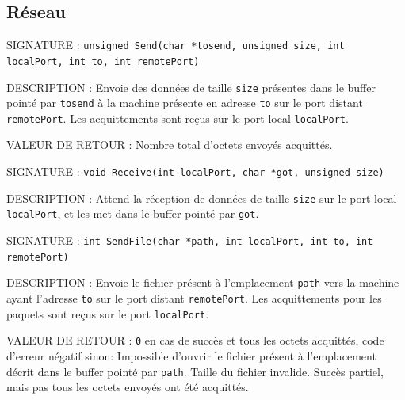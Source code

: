 \documentclass{article}
\begin{document}
	\subsection{Réseau}
		\begin{description}
			\item{SIGNATURE : } \texttt{unsigned Send(char *tosend, unsigned size, int localPort, int to, int remotePort)}
			\item{DESCRIPTION : Envoie des données de taille \texttt{size} présentes dans le buffer pointé par \texttt{tosend} à la machine présente en adresse \texttt{to} sur le port distant \texttt{remotePort}. Les acquittements sont reçus sur le port local \texttt{localPort}.} 
			\item{VALEUR DE RETOUR : Nombre total d'octets envoyés acquittés.} 
		\end{description}
		\vspace{2.5mm}
		\begin{description}
			\item{SIGNATURE : } \texttt{void Receive(int localPort, char *got, unsigned size)}
			\item{DESCRIPTION : Attend la réception de données de taille \texttt{size} sur le port local \texttt{localPort}, et les met dans le buffer pointé par \texttt{got}.} 
		\end{description}
		\vspace{2.5mm}
		\begin{description}
			\item{SIGNATURE : } \texttt{int SendFile(char *path, int localPort, int to, int remotePort)}
			\item{DESCRIPTION : Envoie le fichier présent à l'emplacement \texttt{path} vers la machine ayant l'adresse \texttt{to} sur le port distant \texttt{remotePort}. Les acquittements pour les paquets sont reçus sur le port \texttt{localPort}.} 
			\item{VALEUR DE RETOUR : } \texttt{0} en cas de succès et tous les octets acquittés, code d'erreur négatif sinon: 
				 Impossible d'ouvrir le fichier présent à l'emplacement décrit dans le buffer pointé par \texttt{path}.
				 Taille du fichier invalide.
				 Succès partiel, mais pas tous les octets envoyés ont été acquittés.
		\end{description}
		\vspace{2.5mm}
\end{document}
